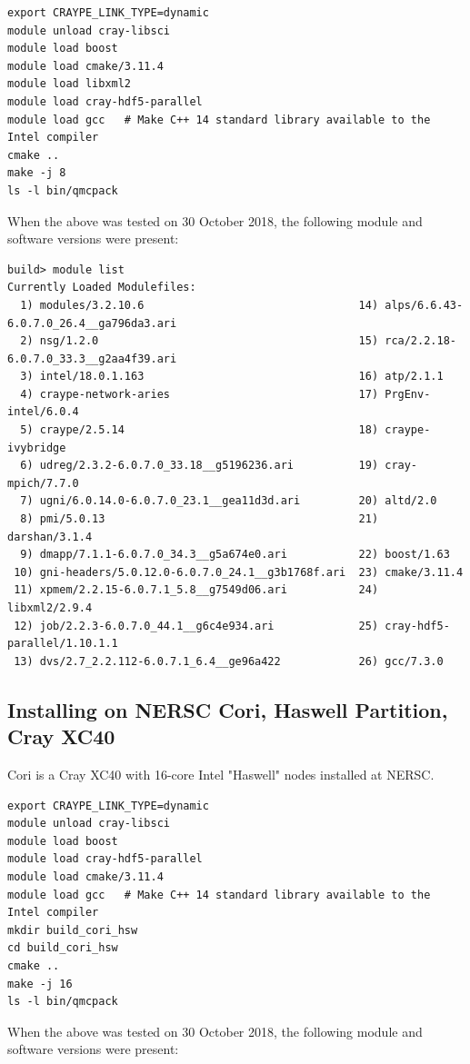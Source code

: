 \verbatimfont{\footnotesize}
\begin{verbatim}
export CRAYPE_LINK_TYPE=dynamic
module unload cray-libsci
module load boost
module load cmake/3.11.4
module load libxml2
module load cray-hdf5-parallel
module load gcc   # Make C++ 14 standard library available to the Intel compiler
cmake ..
make -j 8
ls -l bin/qmcpack
\end{verbatim}
When the above was tested on 30 October 2018, the following module and
software versions were present:
\verbatimfont{\footnotesize}
\begin{verbatim}
build> module list
Currently Loaded Modulefiles:
  1) modules/3.2.10.6                                 14) alps/6.6.43-6.0.7.0_26.4__ga796da3.ari
  2) nsg/1.2.0                                        15) rca/2.2.18-6.0.7.0_33.3__g2aa4f39.ari
  3) intel/18.0.1.163                                 16) atp/2.1.1
  4) craype-network-aries                             17) PrgEnv-intel/6.0.4
  5) craype/2.5.14                                    18) craype-ivybridge
  6) udreg/2.3.2-6.0.7.0_33.18__g5196236.ari          19) cray-mpich/7.7.0
  7) ugni/6.0.14.0-6.0.7.0_23.1__gea11d3d.ari         20) altd/2.0
  8) pmi/5.0.13                                       21) darshan/3.1.4
  9) dmapp/7.1.1-6.0.7.0_34.3__g5a674e0.ari           22) boost/1.63
 10) gni-headers/5.0.12.0-6.0.7.0_24.1__g3b1768f.ari  23) cmake/3.11.4
 11) xpmem/2.2.15-6.0.7.1_5.8__g7549d06.ari           24) libxml2/2.9.4
 12) job/2.2.3-6.0.7.0_44.1__g6c4e934.ari             25) cray-hdf5-parallel/1.10.1.1
 13) dvs/2.7_2.2.112-6.0.7.1_6.4__ge96a422            26) gcc/7.3.0

\end{verbatim}

\subsection{Installing on NERSC Cori, Haswell Partition, Cray XC40}
Cori is a Cray XC40 with 16-core Intel "Haswell" nodes
installed at NERSC.

\verbatimfont{\footnotesize}
\begin{verbatim}
export CRAYPE_LINK_TYPE=dynamic
module unload cray-libsci
module load boost
module load cray-hdf5-parallel
module load cmake/3.11.4
module load gcc   # Make C++ 14 standard library available to the Intel compiler
mkdir build_cori_hsw
cd build_cori_hsw
cmake ..
make -j 16
ls -l bin/qmcpack
\end{verbatim}

When the above was tested on 30 October 2018, the following module and
software versions were present:

